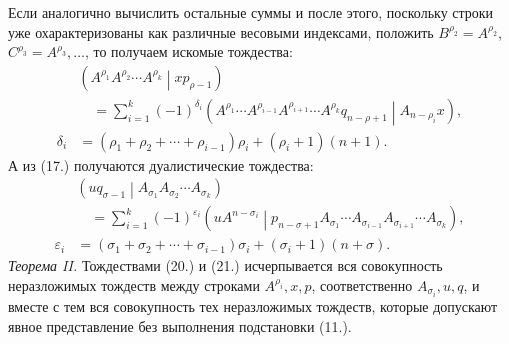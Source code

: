 \documentclass[11pt]{article}
\newcommand{\pair}[2]{\left(#1\middle|#2\right)}
\newcommand{\eps}{\varepsilon}
\begin{document}
Если аналогично вычислить остальные суммы и после этого, поскольку строки уже охарактеризованы как различные весовыми индексами, положить $B^{\rho_2}=A^{\rho_2}$, $C^{\rho_3}=A^{\rho_3},\ldots$, то получаем искомые тождества:
\begin{equation}
\begin{aligned}
&\pair{A^{\rho_1}A^{\rho_2}\cdots A^{\rho_k}}{xp_{\rho-1}}\\
&\quad=\sum_{i=1}^{k}(-1)^{\delta_i}
\pair{A^{\rho_1}\cdots A^{\rho_{i-1}}A^{\rho_{i+1}}\cdots A^{\rho_k}q_{n-\rho+1}}{A_{n-\rho_i}x},\\
\delta_i&=(\rho_1+\rho_2+\cdots+\rho_{i-1})\rho_i+(\rho_i+1)(n+1).
\end{aligned}
\tag{20}
\end{equation}
А из (17.) получаются дуалистические тождества:
\begin{equation}
\begin{aligned}
&\pair{u q_{\sigma-1}}{A_{\sigma_1}A_{\sigma_2}\cdots A_{\sigma_k}}\\
&\quad=\sum_{i=1}^{k}(-1)^{\eps_i}
\pair{u A^{n-\sigma_i}}{p_{n-\sigma+1}A_{\sigma_1}\cdots A_{\sigma_{i-1}}A_{\sigma_{i+1}}\cdots A_{\sigma_k}},\\
\eps_i&=(\sigma_1+\sigma_2+\cdots+\sigma_{i-1})\sigma_i+(\sigma_i+1)(n+\sigma).
\end{aligned}
\tag{21}
\end{equation}
\emph{Теорема II.} Тождествами (20.) и (21.) исчерпывается вся совокупность неразложимых тождеств между строками $A^{\rho_i},x,p$, соответственно $A_{\sigma_i},u,q$, и вместе с тем вся совокупность тех неразложимых тождеств, которые допускают явное представление без выполнения подстановки (11.).
\end{document}
